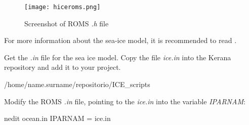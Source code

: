 \begin{figure}[H]
    \centering
    \texttt{[image: hiceroms.png]}
    \caption{Screenshot of ROMS \textit{.h} file}
    \label{hiceroms}
\end{figure}
\bigskip

\begin{tcolorbox}[enhanced,
    grow to left by   = 0cm,
    grow to right by  = 0cm,
    enlarge top by    = 0cm,
    enlarge bottom by = 0cm,
    tcbox raise base,
    boxrule           = 1.0pt,
    left              = 18mm,
    colframe          = green!50!black,coltext=green!25!black,colback=green!10!white,
    overlay           = {\begin{tcbclipinterior}\fill[green!75!blue!50!white] (frame.south west)
      rectangle node[text=white,font=\sffamily\bfseries\footnotesize,rotate=0] {WARNING} ([xshift=18mm]frame.north west);\end{tcbclipinterior}}]
For more information about the sea-ice model, it is recommended to read \textcite{hedstrom2018}.
\end{tcolorbox}
\bigskip

\noindent Get the \textit{.in} file for the sea ice model. Copy the file \textit{ice.in} into the Kerana repository and add it to your project.
\bigskip

\begin{bashcode}
    /home/name.surname/repositorio/ICE_scripts
\end{bashcode}
\bigskip
    
\noindent Modify the ROMS \textit{.in} file, pointing to the \textit{ice.in} into the variable \textit{IPARNAM}:
\bigskip

\begin{bashcode}
nedit ocean.in
IPARNAM =  ice.in
\end{bashcode}